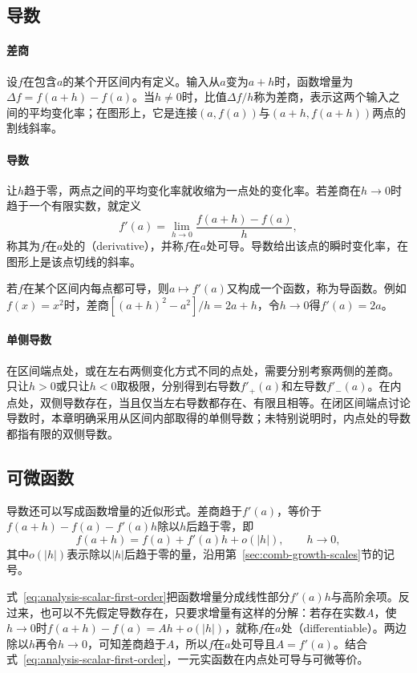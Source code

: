 \subsection{导数}

\paragraph{差商}
设$f$在包含$a$的某个开区间内有定义。输入从$a$变为$a+h$时，函数增量为$\Delta f=f(a+h)-f(a)$。当$h\neq0$时，比值$\Delta f/h$称为差商，表示这两个输入之间的平均变化率；在图形上，它是连接$(a,f(a))$与$(a+h,f(a+h))$两点的割线斜率。

\paragraph{导数}
让$h$趋于零，两点之间的平均变化率就收缩为一点处的变化率。若差商在$h\to0$时趋于一个有限实数，就定义
\[
 f'(a)=\lim_{h\to0}\frac{f(a+h)-f(a)}h,
\]
称其为$f$在$a$处的（derivative），并称$f$在$a$处可导。导数给出该点的瞬时变化率，在图形上是该点切线的斜率。

若$f$在某个区间内每点都可导，则$a\mapsto f'(a)$又构成一个函数，称为导函数。例如$f(x)=x^2$时，差商$[(a+h)^2-a^2]/h=2a+h$，令$h\to0$得$f'(a)=2a$。

\paragraph{单侧导数}
在区间端点处，或在左右两侧变化方式不同的点处，需要分别考察两侧的差商。
只让$h>0$或只让$h<0$取极限，分别得到右导数$f'_+(a)$和左导数$f'_-(a)$。在内点处，双侧导数存在，当且仅当左右导数都存在、有限且相等。在闭区间端点讨论导数时，本章明确采用从区间内部取得的单侧导数；未特别说明时，内点处的导数都指有限的双侧导数。

\subsection{可微函数}

导数还可以写成函数增量的近似形式。差商趋于$f'(a)$，等价于$f(a+h)-f(a)-f'(a)h$除以$h$后趋于零，即
\begin{equation}
 f(a+h)=f(a)+f'(a)h+o(|h|),\qquad h\to0,
\label{eq:analysis-scalar-first-order}
\end{equation}
其中$o(|h|)$表示除以$|h|$后趋于零的量，沿用第~\ref{sec:comb-growth-scales}节的记号。

式~\eqref{eq:analysis-scalar-first-order}把函数增量分成线性部分$f'(a)h$与高阶余项。反过来，也可以不先假定导数存在，只要求增量有这样的分解：若存在实数$A$，使$h\to0$时$f(a+h)-f(a)=Ah+o(|h|)$，就称$f$在$a$处（differentiable）。两边除以$h$再令$h\to0$，可知差商趋于$A$，所以$f$在$a$处可导且$A=f'(a)$。结合式~\eqref{eq:analysis-scalar-first-order}，一元实函数在内点处可导与可微等价。

